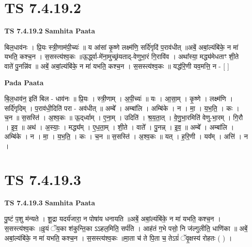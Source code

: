 \documentclass[17pt]{extarticle}
\begin{document}
\section*{ TS 7.4.19.2 }

\textbf{TS 7.4.19.2 } \newline
\textbf{Samhita Paata} \newline

बिल॒धाव॑नः । प्रि॒यः स्त्री॒णाम॑पी॒च्यः॑ ॥ य आ॑सां कृ॒ष्णे लक्ष्म॑णि॒ सर्दि॑गृदिं प॒राव॑धीत् ॥अबें॒ अबां॒ल्यंबि॑के॒ न मा॑ यभति॒ कश्च॒न । स॒सस्त्य॑श्व॒कः ॥ऊ॒र्द्ध्वा-मे॑ना॒मुच्छ्र॑यताद्-वेणुभा॒रं गि॒रावि॑व । अथा᳚स्या॒ मद्ध्य॑मेधताꣳ शी॒ते वाते॑ पु॒नन्नि॑व ॥ अबें॒ अबां॒ल्यंबि॑के॒ न मा॑ यभति॒ कश्च॒न । स॒सस्त्य॑श्व॒कः ॥ यद्ध॑रि॒णी यव॒मत्ति॒ न - [  ] \newline

\textbf{Pada Paata} \newline

बि॒ल॒धाव॑न॒ इति॑ बिल - धाव॑नः ॥ प्रि॒यः । स्त्री॒णाम् । अ॒पी॒च्यः॑ ॥ यः । आ॒सा॒म् । कृ॒ष्णे । लक्ष्म॑णि । सर्दि॑गृदिम् । प॒राव॑धी॒दिति॑ परा - अव॑धीत् ॥ अम्बे᳚ । अम्बा॑लि । अम्बि॑के । न । मा॒ । य॒भ॒ति॒ । कः । च॒न ॥ स॒सस्ति॑ । अ॒श्व॒कः ॥ ऊ॒द्‌र्ध्वाम् । ए॒ना॒म् । उदिति॑ । श्र॒य॒ता॒त् । वे॒णु॒भा॒रमिति॑ वेणु-भा॒रम् । गि॒रौ । इ॒व॒ ॥ अथ॑ । अ॒स्याः॒ । मद्ध्य᳚म् । ए॒ध॒ता॒म् । शी॒ते । वाते᳚ । पु॒नन्न् । इ॒व॒ ॥ अम्बे᳚ । अम्बा॑लि । अम्बि॑के । न । मा॒ । य॒भ॒ति॒ । कः । च॒न ॥ स॒सस्ति॑ । अ॒श्व॒कः ॥ यत् । ह॒रि॒णी । यव᳚म् । अत्ति॑ । न ।  \newline




\section*{ TS 7.4.19.3 }

\textbf{TS 7.4.19.3 } \newline
\textbf{Samhita Paata} \newline

पु॒ष्टं प॒शु म॑न्यते । शू॒द्रा यदर्य॑जारा॒ न पोषा॑य धनायति ॥अबें॒ अबां॒ल्यंबि॑के॒ न मा॑ यभति॒ कश्च॒न । स॒सस्त्य॑श्व॒कः ॥इ॒यं ॅय॒का श॑कुन्ति॒का ऽऽहल॒मिति॒ सर्प॑ति । आह॑तं ग॒भे पसो॒ नि ज॑ल्गुलीति॒ धाणि॑का ॥ अबें॒ अबां॒ल्यंबि॑के॒ न मा॑ यभति॒ कश्च॒न । स॒सस्त्य॑श्व॒कः ॥मा॒ता च॑ ते पि॒ता च॒ तेऽग्रं॑ ॅवृ॒क्षस्य॑ रोहतः ( ) । \newline
\end{document}
